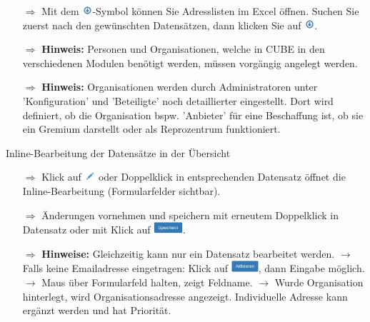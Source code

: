 \documentclass{article}
\begin{document}
\begin{multicols}{2}
\begin{tcolorbox}[colback=blue!5,colframe=blue!40!black,title=Weitere Funktionen in der Adressliste und Hinweise]
\begin{itemize}
  \item[$\Longrightarrow$] Mit dem \includegraphics[height=10pt]{Icons/ListeGenerieren.jpg}-Symbol können Sie Adresslisten im Excel öffnen. Suchen Sie zuerst nach den gewünschten Datensätzen, dann klicken Sie auf \includegraphics[height=10pt]{Icons/ListeGenerieren.jpg}.
  \item[$\Longrightarrow$] \textbf{Hinweis:} Personen und Organisationen, welche in CUBE in den verschiedenen Modulen benötigt werden, müssen vorgängig angelegt werden.
  \item[$\Longrightarrow$] \textbf{Hinweis:} Organisationen werden durch Administratoren unter 'Konfiguration' und 'Beteiligte' noch detaillierter eingestellt. Dort wird definiert, ob die Organisation bspw. 'Anbieter' für eine Beschaffung ist, ob sie ein Gremium darstellt oder als Reprozentrum funktioniert.
\end{itemize}
\end{tcolorbox}

\end{multicols}

\begin{beamerlikethm}{Inline-Bearbeitung der Datensätze in der Übersicht}
\begin{itemize}
  \item[$\Longrightarrow$] Klick auf \includegraphics[height=10pt]{Icons/Stift.jpg} oder Doppelklick in entsprechenden Datensatz öffnet die Inline-Bearbeitung (Formularfelder sichtbar).
  \item[$\Longrightarrow$] Änderungen vornehmen und speichern mit erneutem Doppelklick in Datensatz oder mit Klick auf \includegraphics[height=12pt]{Icons/Speichern.png}.
  \item[$\Longrightarrow$] \textbf{Hinweise:} Gleichzeitig kann nur ein Datensatz bearbeitet werden. $\rightarrow$ Falls keine Emailadresse eingetragen: Klick auf \includegraphics[height=12pt]{Icons/Aktivieren.png}, dann Eingabe möglich. $\rightarrow$ Maus über Formularfeld halten, zeigt Feldname. $\rightarrow$ Wurde Organisation hinterlegt, wird Organisationsadresse angezeigt. Individuelle Adresse kann ergänzt werden und hat Priorität.
\end{itemize}
\end{beamerlikethm}
\end{document}
